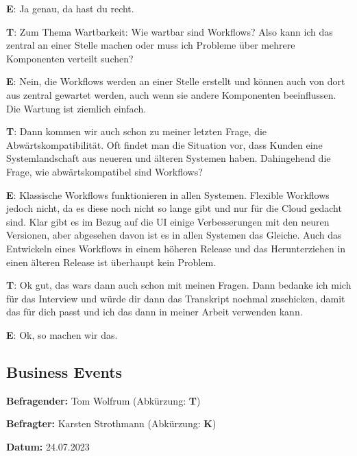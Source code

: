\begin{list}{X:}{\setlength{\labelsep}{5mm}}
 \item[\textbf{E}:] Ja genau, da hast du recht.
 \item[\textbf{T}:] Zum Thema Wartbarkeit: Wie wartbar sind Workflows? Also kann ich das zentral an einer Stelle machen oder muss ich Probleme über mehrere Komponenten verteilt suchen?
 \item[\textbf{E}:] Nein, die Workflows werden an einer Stelle erstellt und können auch von dort aus zentral gewartet werden, auch wenn sie andere Komponenten beeinflussen. Die Wartung ist ziemlich einfach.
 \item[\textbf{T}:] Dann kommen wir auch schon zu meiner letzten Frage, die Abwärtskompatibilität. Oft findet man die Situation vor, dass Kunden eine Systemlandschaft aus neueren und älteren Systemen haben. Dahingehend die Frage, wie abwärtskompatibel sind Workflows?
 \item[\textbf{E}:] Klassische Workflows funktionieren in allen Systemen. Flexible Workflows jedoch nicht, da es diese noch nicht so lange gibt und nur für die Cloud gedacht sind. Klar gibt es im Bezug auf die UI einige Verbesserungen mit den neuren Versionen, aber abgesehen davon ist es in allen Systemen das Gleiche. Auch das Entwickeln eines Workflows in einem höheren Release und das Herunterziehen in einen älteren Release ist überhaupt kein Problem.
 \item[\textbf{T}:] Ok gut, das wars dann auch schon mit meinen Fragen. Dann bedanke ich mich für das Interview und würde dir dann das Transkript nochmal zuschicken, damit das für dich passt und ich das dann in meiner Arbeit verwenden kann.
 \item[\textbf{E}:] Ok, so machen wir das.
\end{list}

\subsection*{Business Events} \label{T_Business-Events}

\textbf{Befragender:} Tom Wolfrum (Abkürzung: \textbf{T})

\textbf{Befragter:} Karsten Strothmann (Abkürzung: \textbf{K})

\textbf{Datum:} 24.07.2023

